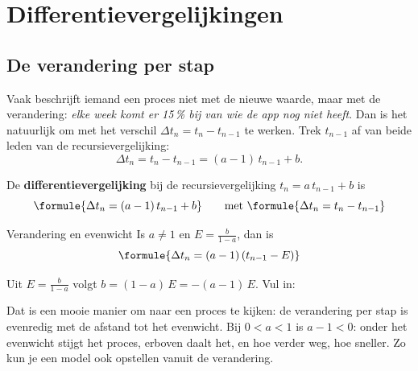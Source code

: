 \section{Differentievergelijkingen}

\subsection{De verandering per stap}

Vaak beschrijft iemand een proces niet met de nieuwe waarde, maar met de verandering: \textit{elke week komt er 15\,\% bij van wie de app nog niet heeft}. Dan is het natuurlijk om met het verschil $\Delta t_n = t_n - t_{n-1}$ te werken. Trek $t_{n-1}$ af van beide leden van de recursievergelijking:
\[
\Delta t_n = t_n - t_{n-1} = (a - 1)\, t_{n-1} + b .
\]

\begin{theorie}
De \textbf{\textcolor{accent}{differentievergelijking}} bij de recursievergelijking $t_n = a\, t_{n-1} + b$ is
\[
\formule{\Delta t_n = (a - 1)\, t_{n-1} + b} \qquad \text{met } \formule{\Delta t_n = t_n - t_{n-1}}
\]
\begin{stelling}{Verandering en evenwicht}
Is $a \neq 1$ en $E = \tfrac{b}{1 - a}$, dan is
\[
\formule{\Delta t_n = (a - 1)\,(t_{n-1} - E)}
\]
\end{stelling}

\begin{bewijs}
Uit $E = \tfrac{b}{1 - a}$ volgt $b = (1 - a)\,E = -(a - 1)\,E$. Vul in:
\end{bewijs}
\end{theorie}

Dat is een mooie manier om naar een proces te kijken: de verandering per stap is evenredig met de afstand tot het evenwicht. Bij $0 < a < 1$ is $a - 1 < 0$: onder het evenwicht stijgt het proces, erboven daalt het, en hoe verder weg, hoe sneller. Zo kun je een model ook opstellen vanuit de verandering.

